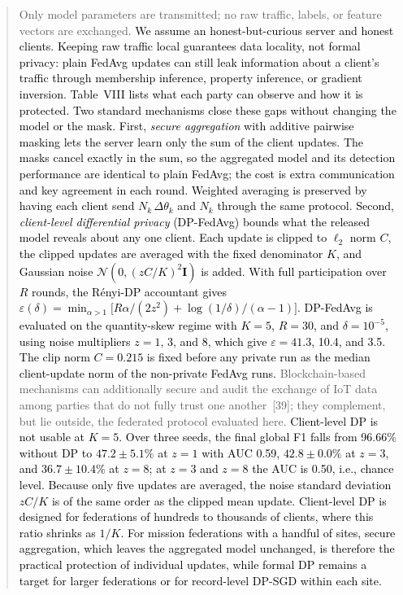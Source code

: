 \documentclass[11pt]{article}
\newenvironment{excerpt}{\begin{quote}\sloppy}{\end{quote}}
\begin{document}
\begin{excerpt}
Only model parameters are transmitted; no raw traffic, labels,
or feature vectors are exchanged. \textcolor{black}{We assume
an honest-but-curious server and honest clients. Keeping raw traffic
local guarantees data locality, not formal privacy: plain FedAvg
updates can still leak information about a client's traffic through
membership inference, property inference, or gradient inversion.
Table~VIII lists what each party can observe and
how it is protected. Two standard mechanisms close these gaps without
changing the model or the mask. First, \textit{secure aggregation}
with additive pairwise masking lets the server learn only the sum of
the client updates. The masks cancel exactly in the sum, so the
aggregated model and its detection performance are identical to plain
FedAvg; the cost is extra communication and key agreement in each
round. Weighted averaging is preserved by having each client send
$N_k\,\Delta\theta_k$ and $N_k$ through the same protocol. Second,
\textit{client-level differential privacy} (DP-FedAvg) bounds what
the released model reveals about any one client. Each update is
clipped to $\ell_2$ norm $C$, the clipped updates are averaged with
the fixed denominator $K$, and Gaussian noise
$\mathcal{N}(0,(zC/K)^2\mathbf{I})$ is added. With full participation
over $R$ rounds, the R\'enyi-DP accountant gives
$\varepsilon(\delta)=\min_{\alpha>1}\bigl[R\alpha/(2z^2)+
\log(1/\delta)/(\alpha-1)\bigr]$. DP-FedAvg is evaluated on the
quantity-skew regime with $K=5$, $R=30$, and $\delta=10^{-5}$, using
noise multipliers $z=1$, 3, and 8, which give $\varepsilon=41.3$,
10.4, and 3.5. The clip norm $C=0.215$ is fixed before any private
run as the median client-update norm of the non-private FedAvg runs.}
Blockchain-based mechanisms can additionally secure and audit the
exchange of IoT data among parties that do not fully trust one
another~{[39]}; they complement, but lie outside,
the federated protocol evaluated here.
\textcolor{black}{Client-level DP is not usable at $K=5$. Over
three seeds, the final global F1 falls from 96.66\% without DP to
$47.2\pm5.1\%$ at $z=1$ with AUC 0.59, $42.8\pm0.0\%$ at $z=3$, and
$36.7\pm10.4\%$ at $z=8$; at $z=3$ and $z=8$ the AUC is 0.50, i.e.,
chance level. Because only five updates are averaged, the noise
standard deviation $zC/K$ is of the same order as the clipped mean
update. Client-level DP is designed for federations of hundreds to
thousands of clients, where this ratio shrinks as $1/K$. For mission
federations with a handful of sites, secure aggregation, which leaves
the aggregated model unchanged, is therefore the practical protection
of individual updates, while formal DP remains a target for larger
federations or for record-level DP-SGD within each site.}


\end{excerpt}
\end{document}
